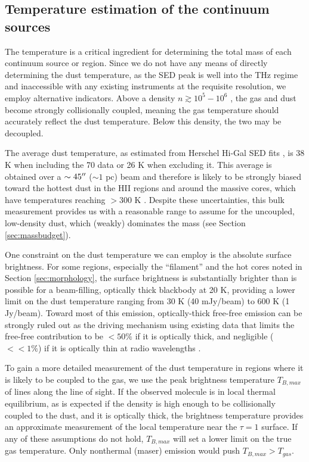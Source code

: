 \documentclass{aa}
\begin{document}
\subsection{Temperature estimation of the continuum sources}
\label{sec:temperature}
The temperature is a critical ingredient for determining the total mass of each
continuum source or region. Since we do not have any means of directly
determining the dust temperature, as the SED peak is well into the THz regime
and inaccessible with any existing instruments at the requisite resolution, we
employ alternative indicators.  Above a density $n\gtrsim10^5-10^6$ \percc,
the gas and dust become strongly collisionally coupled, meaning the gas
temperature should accurately reflect the dust temperature.  Below this density,
the two may be decoupled.

The average dust temperature, as estimated from Herschel Hi-Gal SED fits
\citep{Molinari2016a,Wang2015a}, is 38 K when including the 70 \um data or 26 K
when excluding it.  This average is obtained over a $\sim45\mbox{$^{\prime\prime}$}$ ($\sim 1$
pc) beam and therefore is likely to be strongly biased toward the hottest dust
in the HII regions and around the massive cores, which have
temperatures reaching $>300$ K \citep{Goddi2016a}.  Despite these
uncertainties, this bulk measurement provides us with a reasonable range to
assume for the uncoupled, low-density dust, which (weakly) dominates the mass
(see Section \ref{sec:massbudget}).

One constraint on the dust temperature we can employ is the absolute surface
brightness.  For some regions, especially the ``filament'' and the hot cores
noted in Section \ref{sec:morphology}, the surface brightness is substantially
brighter than is possible for a beam-filling, optically thick blackbody at 20
K, providing a lower limit on the dust temperature ranging from 30 K (40
mJy/beam) to 600 K (1 Jy/beam).  Toward most of this emission, optically-thick
free-free emission can be strongly ruled out as the driving mechanism using
existing data that limits the free-free contribution to be $<50\%$ if it is
optically thick, and negligible ($<<1\%$) if it is optically thin at radio wavelengths
\citep{Ginsburg2016b, Goddi2016a}.

To gain a more detailed measurement of the dust temperature in regions where it
is likely to be coupled to the gas, we use the peak brightness temperature
$T_{B,max}$ of lines along the line of sight.  If the observed molecule is in
local thermal equilibrium, as is expected if the density is high enough to be
collisionally coupled to the dust, and it is optically thick, the brightness
temperature provides an approximate measurement of the local temperature near
the $\tau=1$ surface.  If any of these assumptions do not hold, $T_{B,max}$
will set a lower limit on the true gas temperature.  Only nonthermal (maser)
emission would push $T_{B,max} > T_{gas}$.
\end{document}
